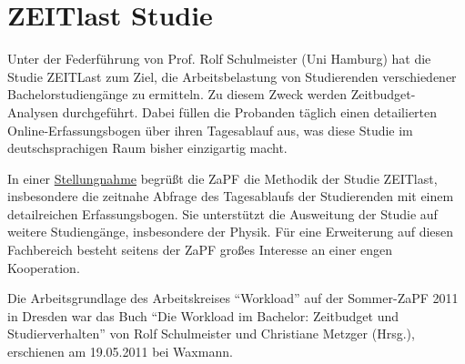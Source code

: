 \documentclass{scrartcl}
\begin{document}
\section*{ZEITlast Studie}
Unter der Federführung von Prof. Rolf Schulmeister (Uni Hamburg) hat die Studie ZEITLast zum Ziel, die Arbeitsbelastung
von Studierenden verschiedener Bachelorstudiengänge zu ermitteln. Zu diesem Zweck werden Zeitbudget-Analysen
durchgeführt. Dabei füllen die Probanden täglich einen detailierten Online-Erfassungsbogen über ihren Tagesablauf aus,
was diese Studie im deutschsprachigen Raum bisher einzigartig macht.

In einer \href{http://zapfev.de/sites/default/files/2011_05_Stellungnahme_ZEITlast.pdf}{Stellungnahme} begrüßt die ZaPF
die Methodik der Studie ZEITlast,
insbesondere die zeitnahe Abfrage des Tagesablaufs der Studierenden mit einem detailreichen Erfassungsbogen. Sie
unterstützt die Ausweitung der Studie auf weitere Studiengänge, insbesondere der Physik. Für eine Erweiterung auf diesen
Fachbereich besteht seitens der ZaPF großes Interesse an einer engen Kooperation.

Die Arbeitsgrundlage des Arbeitskreises “Workload” auf der Sommer-ZaPF 2011 in Dresden war das Buch “Die Workload im
Bachelor: Zeitbudget und Studierverhalten” von Rolf Schulmeister und Christiane Metzger (Hrsg.), erschienen am
19.05.2011 bei Waxmann.
\end{document}
